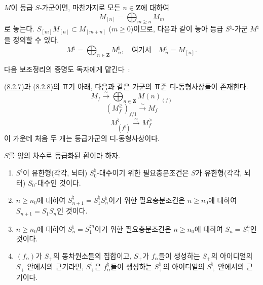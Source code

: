 \begin{env}[8.2.8]
\label{II.8.2.8-ko}
$M$이 등급 $S$-가군이면, 마찬가지로 모든 $n\in\mathbf{Z}$에 대하여
\begin{equation}
\label{II.8.2.8.1-ko}
  M_{[n]}=\bigoplus_{m\geq n}M_m
\tag{8.2.8.1}
\end{equation}
로 놓는다. $S_{[m]}M_{[n]}\subset M_{[m+n]}$ ($m\geq0$)이므로,
다음과 같이 놓아 등급 $S^\natural$-가군 $M^\natural$을 정의할 수 있다.
\begin{equation}
\label{II.8.2.8.2-ko}
  M^\natural=\bigoplus_{n\in\mathbf{Z}}M_n^\natural,
  \quad\text{여기서}\quad M_n^\natural=M_{[n]}.
\tag{8.2.8.2}
\end{equation}
\end{env}

다음 보조정리의 증명도 독자에게 맡긴다~:

\begin{lemma}[8.2.9]
\label{II.8.2.9-ko}
(\hyperref[II.8.2.7-ko]{8.2.7})과
(\hyperref[II.8.2.8-ko]{8.2.8})의 표기 아래, 다음과 같은 가군의 표준
디-동형사상들이 존재한다.
\begin{equation}
\label{II.8.2.9.1-ko}
  M_f\xrightarrow{\sim}\bigoplus_{n\in\mathbf{Z}}M(n)_{(f)}
\tag{8.2.9.1}
\end{equation}
\begin{equation}
\label{II.8.2.9.2-ko}
  (M_f^{\geq})_{f/1}\xrightarrow{\sim}M_f
\tag{8.2.9.2}
\end{equation}
\begin{equation}
\label{II.8.2.9.3-ko}
  M^\natural_{(f^\natural)}\xrightarrow{\sim}M_f^{\geq}
\tag{8.2.9.3}
\end{equation}
이 가운데 처음 두 개는 등급가군의 디-동형사상이다.
\end{lemma}

\begin{lemma}[8.2.10]
\label{II.8.2.10-ko}
$S$를 양의 차수로 등급화된 환이라 하자.
\begin{enumerate}
\item[\rm(i)] $S^\natural$이 유한형(각각, 뇌터) $S_0^\natural$-대수이기
위한 필요충분조건은 $S$가 유한형(각각, 뇌터) $S_0$-대수인 것이다.
\item[\rm(ii)] $n\geq n_0$에 대하여
$S_{n+1}^\natural=S_1^\natural S_n^\natural$이기 위한 필요충분조건은
$n\geq n_0$에 대하여 $S_{n+1}=S_1S_n$인 것이다.
\item[\rm(iii)] $n\geq n_0$에 대하여 $S_n^\natural=S_1^{\natural n}$이기
위한 필요충분조건은 $n\geq n_0$에 대하여 $S_n=S_1^n$인 것이다.
\item[\rm(iv)] $(f_\alpha)$가 $S_+$의 동차원소들의 집합이고, $S_+$가
$f_\alpha$들이 생성하는 $S_+$의 아이디얼의 $S_+$ 안에서의 근기라면,
$S_+^\natural$은 $f_\alpha^\natural$들이 생성하는
$S_+^\natural$의 아이디얼의 $S_+^\natural$ 안에서의 근기이다.
\end{enumerate}
\end{lemma}


